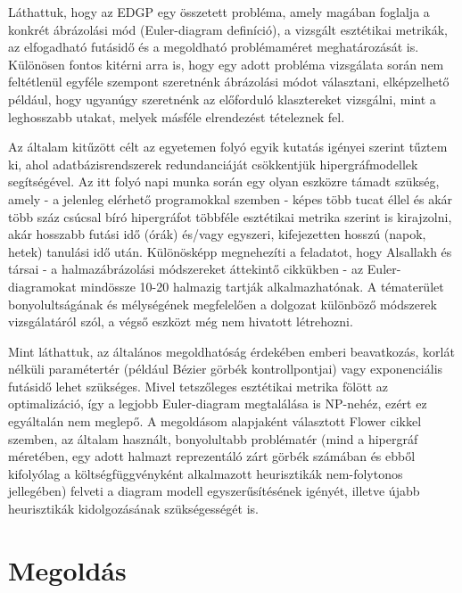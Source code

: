 Láthattuk, hogy az EDGP egy összetett probléma, amely magában foglalja a konkrét ábrázolási mód (Euler-diagram definíció), a vizsgált esztétikai metrikák, az elfogadható futásidő és a megoldható problémaméret meghatározását is. Különösen fontos kitérni arra is, hogy egy adott probléma vizsgálata során nem feltétlenül egyféle szempont szeretnénk ábrázolási módot választani, elképzelhető például, hogy ugyanúgy szeretnénk az előforduló klasztereket vizsgálni, mint a leghosszabb utakat, melyek másféle elrendezést tételeznek fel.


Az általam kitűzött célt az egyetemen folyó egyik kutatás igényei szerint tűztem ki, ahol adatbázisrendszerek redundanciáját csökkentjük hipergráfmodellek segítségével. Az itt folyó napi munka során egy olyan eszközre támadt szükség, amely - a jelenleg elérhető programokkal szemben - képes több tucat éllel és akár több száz csúcsal bíró hipergráfot többféle esztétikai metrika szerint is kirajzolni, akár hosszabb futási idő (órák) és/vagy egyszeri, kifejezetten hosszú (napok, hetek) tanulási idő után. Különösképp megnehezíti a feladatot, hogy Alsallakh és társai - a halmazábrázolási módszereket áttekintő cikkükben\cite{alsallakah2016_the_state_of_the_art_set_visualization} - az Euler-diagramokat mindössze 10-20 halmazig tartják alkalmazhatónak. A tématerület bonyolultságának és mélységének megfelelően a dolgozat különböző módszerek vizsgálatáról szól, a végső eszközt még nem hivatott létrehozni.


Mint láthattuk, az általános megoldhatóság érdekében emberi beavatkozás, korlát nélküli paramétertér (például Bézier görbék kontrollpontjai\cite{layout_metrics}) vagy exponenciális futásidő\cite{inductive_euler} lehet szükséges. Mivel tetszőleges esztétikai metrika fölött az optimalizáció, így a legjobb Euler-diagram megtalálása is NP-nehéz, ezért ez egyáltalán nem meglepő. A megoldásom alapjaként választott Flower cikkel\cite{layout_metrics} szemben, az általam használt, bonyolultabb problématér (mind a hipergráf méretében, egy adott halmazt reprezentáló zárt görbék számában és ebből kifolyólag a költségfüggvényként alkalmazott heurisztikák nem-folytonos jellegében) felveti a diagram modell egyszerűsítésének igényét, illetve újabb heurisztikák kidolgozásának szükségességét is.


\section{Megoldás}

